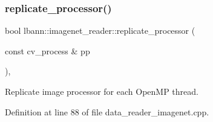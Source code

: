 \mbox{\label{classlbann_1_1imagenet__reader_a1b642b5eb01b209e72bdd8dfa139cafd}} 
\subsubsection{\texorpdfstring{replicate\+\_\+processor()}{replicate\_processor()}}
{\footnotesize\ttfamily bool lbann\+::imagenet\+\_\+reader\+::replicate\+\_\+processor (\begin{DoxyParamCaption}\item[{const cv\+\_\+process \&}]{pp }\end{DoxyParamCaption})\hspace{0.3cm}{\ttfamily [protected]}, {\ttfamily [virtual]}}



Replicate image processor for each Open\+MP thread. 



Definition at line 88 of file data\+\_\+reader\+\_\+imagenet.\+cpp.



